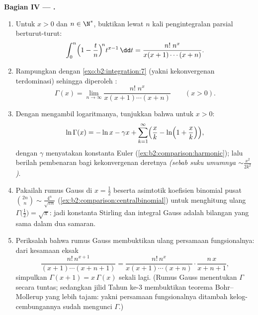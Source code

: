 \begin{problem}
\medskip
\noindent\textbf{Bagian IV --- .}
\begin{enumerate}[resume]
  \item Untuk $x > 0$ dan $n \in \N^*$, buktikan lewat $n$ kali
        pengintegralan parsial berturut-turut:
        \[
        \int_0^n \Bigl(1 - \frac tn\Bigr)^{\!n} t^{x-1}\,\dd t
        = \frac{n!\;n^x}{x(x+1)\cdots(x+n)} .
        \]
  \item Rampungkan dengan \cref{exo:b2:integration:7} (yakni
        kekonvergenan terdominasi) sehingga diperoleh \emph{}:
        \[
        \Gamma(x) = \lim_{n\to\infty}
        \frac{n!\;n^x}{x(x+1)\cdots(x+n)}
        \qquad (x > 0).
        \]
  \item Dengan mengambil logaritmanya, tunjukkan bahwa untuk $x > 0$:
        \[
        \ln\Gamma(x) = -\ln x - \gamma x +
        \sum_{k=1}^{\infty}\Bigl(\frac xk -
        \ln\Bigl(1 + \frac xk\Bigr)\Bigr),
        \]
        dengan $\gamma$ menyatakan konstanta Euler
        (\cref{ex:b2:comparison:harmonic}); lalu berilah pembenaran bagi
        kekonvergenan deretnya \emph{(sebab suku umumnya
        $\sim \frac{x^2}{2k^2}$)}.
  \item Pakailah rumus Gauss di $x = \frac12$ beserta asimtotik
        koefisien binomial pusat $\binom{2n}{n} \sim
        \frac{4^n}{\sqrt{\pi n}}$
        (\cref{ex:b2:comparison:centralbinomial}) untuk menghitung ulang
        $\Gamma\bigl(\frac12\bigr) = \sqrt\pi$: jadi konstanta
        Stirling dan integral Gauss adalah bilangan yang sama
        dalam dua samaran.
  \item Periksalah bahwa rumus Gauss membuktikan ulang persamaan
        fungsionalnya: dari kesamaan eksak
        \[
        \frac{n!\,n^{x+1}}{(x+1)\cdots(x+n+1)}
        = \frac{n!\,n^{x}}{x(x+1)\cdots(x+n)}\cdot
        \frac{n\,x}{x+n+1},
        \]
        simpulkan $\Gamma(x+1) = x\,\Gamma(x)$ sekali lagi. (Rumus
        Gauss menentukan $\Gamma$ secara tuntas; sedangkan jilid Tahun
        ke-3 membuktikan teorema Bohr--Mollerup yang lebih tajam:
        yakni persamaan fungsionalnya ditambah kelog-cembungannya sudah
        mengunci $\Gamma$.)
\end{enumerate}


\end{problem}
